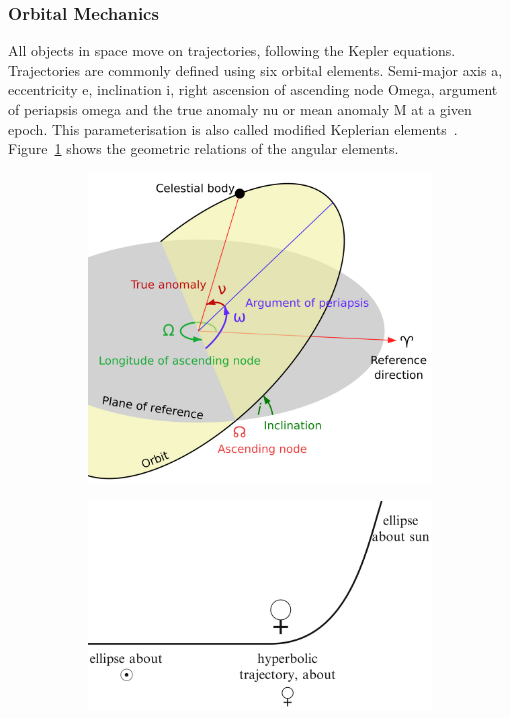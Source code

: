 \subsubsection{Orbital Mechanics} \label{sec:orbit_mechanics}
All objects in space move on trajectories, following the Kepler equations. Trajectories are commonly defined using six orbital elements. Semi-major axis \gls{a}, eccentricity \gls{e}, inclination \gls{i}, right ascension of ascending node \gls{Omega}, argument of periapsis \gls{omega} and the true anomaly \gls{nu} or mean anomaly \gls{M} at a given epoch. This parameterisation is also called modified Keplerian elements~\cite{Hintz2015FundamentalsAstrodynamics}. Figure~\ref{fig:kepler_elements} shows the geometric relations of the angular elements.
\begin{figure}[htb]
    \centering
    \begin{subfigure}[b]{0.47\textwidth}
        \includegraphics[width=.8\textwidth]{doc/thesis/0_figures/Orbit_elements.png}
        \caption{}
        \label{fig:kepler_elements}
    \end{subfigure}
    \begin{subfigure}[b]{0.47\textwidth}
        \centering
        \includegraphics[width=\textwidth]{doc/thesis/0_figures/Hyperbolic_trajectory.png}

\end{subfigure}
\end{figure}
